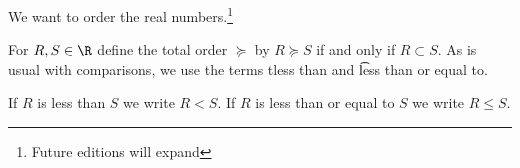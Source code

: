 

We want to order the real numbers.\footnote{Future editions will expand}


For $R, S \in \R$ define the total order $\succeq$ by $R \succeq S$ if and only if $R \subset S$.
As is usual with comparisons, we use the terms t{less than} and \t{less than or equal to}.


If $R$ is less than $S$ we write $R < S$.
If $R$ is less than or equal to $S$ we write $R \leq S$.

\blankpage
